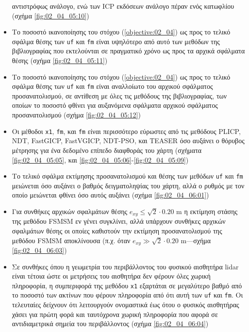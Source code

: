 \begin{itemize}
        αντιστρόφως ανάλογο, ενώ των ICP εκδόσεων ανάλογο πέραν ενός κατωφλίου
        (σχήμα \ref{fig:02_04_05:10})
  \item Το ποσοστό ικανοποίησης του στόχου (\ref{objective:02_04}) ως προς το
        τελικό σφάλμα θέσης των \texttt{uf} και \texttt{fm} είναι υψηλότερο
        από αυτό των μεθόδων της βιβλιογραφίας που εκτελούνται σε πραγματικό
        χρόνο ως προς τα αρχικά σφάλματα θέσης (σχήμα \ref{fig:02_04_05:11})
  \item Το ποσοστό ικανοποίησης του στόχου (\ref{objective:02_04}) ως προς
        το τελικό σφάλμα θέσης των \texttt{uf} και \texttt{fm} είναι αναλλοίωτο
        του αρχικού σφάλματος προσανατολισμού, σε αντίθεση με όλες τις μεθόδους
        της βιβλιογραφίας, των οποίων το ποσοστό φθίνει για αυξανόμενα σφάλματα
        αρχικού σφάλματος προσανατολισμού (σχήμα \ref{fig:02_04_05:12})
  \item Οι μέθοδοι \texttt{x1}, \texttt{fm}, και \texttt{fm} είναι περισσότερο
        εύρωστες από τις μεθόδους PLICP, NDT, FastGICP, FastVGICP, NDT-PSO, και
        TEASER όσο αυξάνει ο θόρυβος μέτρησης για ένα δεδομένο επίπεδο
        διαφθοράς του χάρτη (σχήματα \ref{fig:02_04_05:05}, και
        \ref{fig:02_04_05:06}-\ref{fig:02_04_05:09})
  \item Το τελικό σφάλμα εκτίμησης προσανατολισμού και θέσης των μεθόδων
        \texttt{uf} και \texttt{fm} μειώνεται όσο αυξάνει ο βαθμός
        δειγματοληψίας του χάρτη, αλλά ο ρυθμός με τον οποίο μειώνεται φθίνει
        όσο αυτός αυξάνει (σχήμα \ref{fig:02_04_06:01})
  \item Για συνθήκες αρχικών σφαλμάτων θέσης $e_{xy} \leq \sqrt{2}\cdot 0.20$ m
        η εκτίμηση στάσης της μεθόδου FSMSM εν γένει συγκλίνει, αλλά υπάρχουν
        συνθήκες αρχικών σφαλμάτων θέσης οι οποίες καθιστούν την εκτίμηση
        προσανατολισμού της μεθόδου FSMSM αποκλίνουσα (π.χ.  όταν $e_{xy} \gg
        \sqrt{2}\cdot 0.20$ m---σχήμα \ref{fig:02_04_06:03})
  \item Σε συνθήκες όπου η γεωμετρία του περιβάλλοντος του φυσικού αισθητήρα
        lidar είναι τέτοια ώστε οι μετρήσεις του αισθητήρα δεν φέρουν όλες
        χωρική πληροφορία, η συμπεριφορά της μεθόδου \texttt{x1} εξαρτάται
        σε μεγαλύτερο βαθμό από το ποσοστό των ακτίνων που φέρουν πληροφορία
        από ότι αυτή των \texttt{uf} και \texttt{fm}. Οι τελευταίες δείχνουν
        ότι λειτουργούν ονομαστικά έως ότου ο φυσικός αισθητήρας χάσει για
        πρώτη φορά και ταυτόχρονα χωρική πληροφορία που αφορά σε αντιδιαμετρικά
        σημεία του περιβάλλοντος (σχήμα \ref{fig:02_04_06:04})

\end{itemize}
